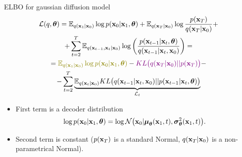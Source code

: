 \begin{frame}{ELBO for gaussian diffusion model}
		\vspace{-0.5cm}
		\begin{multline*}
			\cL(q, \btheta) = \bbE_{q(\bx_1 | \bx_0)} \log p(\bx_0 | \bx_1, \btheta) + \bbE_{q(\bx_T | \bx_0)} \log \frac{p(\bx_T)}{q(\bx_T | \bx_0)} + \\
			  + \sum_{t=2}^T \bbE_{q(\bx_{t-1}, \bx_t | \bx_0)} \log \left( \frac{p(\bx_{t-1} | \bx_t, \btheta)}{q(\bx_{t-1}|\bx_{t}, \bx_0)}\right) =
			  \\ =  {\color{olive}\bbE_{q(\bx_1 | \bx_0)} \log p(\bx_0 | \bx_1, \btheta)} - {\color{violet}KL\bigl(q(\bx_T | \bx_0) || p(\bx_T)\bigr)} - \\
			- \sum_{t=2}^T \underbrace{ \bbE_{q(\bx_t | \bx_0)} KL \bigl(q(\bx_{t-1} | \bx_t, \bx_0) || p(\bx_{t - 1} | \bx_t, \btheta )\bigr)}_{\cL_t}
		\end{multline*}
		\vspace{-0.5cm}
	\begin{itemize}
		\item {\color{olive}First term} is a decoder distribution
		\[
			\log p(\mathbf{x}_0 | \mathbf{x}_1, \boldsymbol{\theta}) = \log \mathcal{N} \bigl(\mathbf{x}_0 | \boldsymbol{\mu}_{\boldsymbol{\theta}}(\mathbf{x}_1, t), \boldsymbol{\sigma}_{\boldsymbol{\theta}}^2(\mathbf{x}_1, t)\bigr).
		\] 
		\item {\color{violet}Second term} is constant ($p(\mathbf{x}_T)$ is a standard Normal, $q(\mathbf{x}_T | \mathbf{x}_0)$ is a non-parametrical Normal).
	\end{itemize}
\end{frame}
